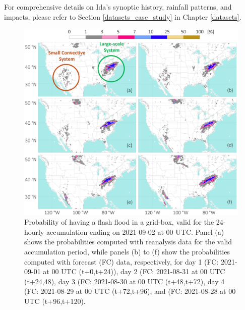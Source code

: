 \documentclass[nhess, manuscript]{copernicus}
\begin{document}
For comprehensive details on Ida's synoptic history, rainfall patterns, and impacts, please refer to Section \ref{datasets_case_study} in Chapter \ref{datasets}.

\begin{figure}[t]
\includegraphics[width=15cm]{figures/case_study_poff.png}
\caption{Probability of having a flash flood in a grid-box, valid for the 24-hourly accumulation ending on 2021-09-02 at 00 UTC. Panel (a) shows the probabilities computed with reanalysis data for the valid accumulation period, while panels (b) to (f) show the probabilities computed with forecast (FC) data, respectively, for day 1 (FC: 2021-09-01 at 00 UTC (t+0,t+24)), day 2 (FC: 2021-08-31 at 00 UTC (t+24,48), day 3 (FC: 2021-08-30 at 00 UTC (t+48,t+72), day 4 (FC: 2021-08-29 at 00 UTC (t+72,t+96), and (FC: 2021-08-28 at 00 UTC (t+96,t+120).}
\label{fig:case_study_poff}
\end{figure}
\end{document}
